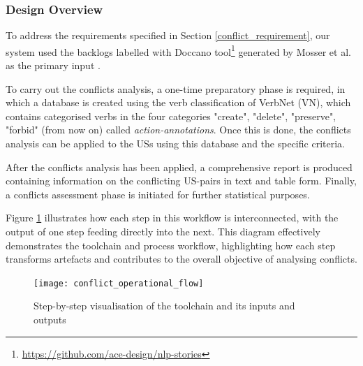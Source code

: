 \subsubsection*{Design Overview}
To address the requirements specified in Section \ref{conflict_requirement}, our system used the backlogs labelled with Doccano tool\footnote{\href{https://github.com/ace-design/nlp-stories}{https://github.com/ace-design/nlp-stories}} generated by Mosser et al. as the primary input \cite{arulmohan2023extracting}.

To carry out the conflicts analysis, a one-time preparatory phase is required, in which a database is created using the verb classification of VerbNet (VN), which contains categorised verbs in the four categories "create", "delete", "preserve", "forbid" (from now on) called \textit{action-annotations}. Once this is done, the conflicts analysis can be applied to the USs using this database and the specific criteria.

After the conflicts analysis has been applied, a comprehensive report is produced containing information on the conflicting US-pairs in text and table form. Finally, a conflicts assessment phase is initiated for further statistical purposes.

Figure \ref{fig:conflict_operational_flow} illustrates how each step in this workflow is interconnected, with the output of one step feeding directly into the next. This diagram effectively demonstrates the toolchain and process workflow, highlighting how each step transforms artefacts and contributes to the overall objective of analysing conflicts.
\begin{figure}[h]
	\centering 
	\texttt{[image: conflict\_operational\_flow]}
	\caption{Step-by-step visualisation of the toolchain and its inputs and outputs}\label{fig:conflict_operational_flow}
\end{figure}
